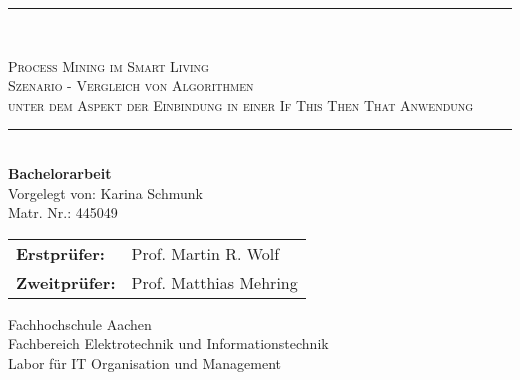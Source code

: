 \begin{titlepage}
\begin{center}
\hfill
\newcommand{\HorizontalLine}{\rule{\linewidth}{0.3mm}}
\HorizontalLine \\[0.4cm]
\begin{spacing}{2.5}
    \textsc{\Large  Process Mining im Smart Living} \\
    \textsc{\Large  Szenario - Vergleich von Algorithmen} \\
    \textsc{\Large   unter dem Aspekt der Einbindung in einer If This Then That Anwendung}\\
\end{spacing}
\HorizontalLine \\[0.5cm]

\vspace{20mm}
{\Large \bfseries Bachelorarbeit}\\[1.1cm]
{\large Vorgelegt von: Karina Schmunk} \\[0.5cm]
{\large Matr. Nr.: 445049} \\[2.2cm]

\begin{tabular}[hc]{>{\large}l >{\large}l}
  \bfseries Erstprüfer: & Prof. Martin R. Wolf \\[0.3cm]
  \bfseries Zweitprüfer: & Prof. Matthias Mehring \\[1.2cm]
\end{tabular}
\vfill  %

\Large {
    Fachhochschule Aachen\\
    Fachbereich Elektrotechnik und Informationstechnik\\
    Labor für IT Organisation und Management\\[1cm]

    
}
\end{center}
\end{titlepage}
